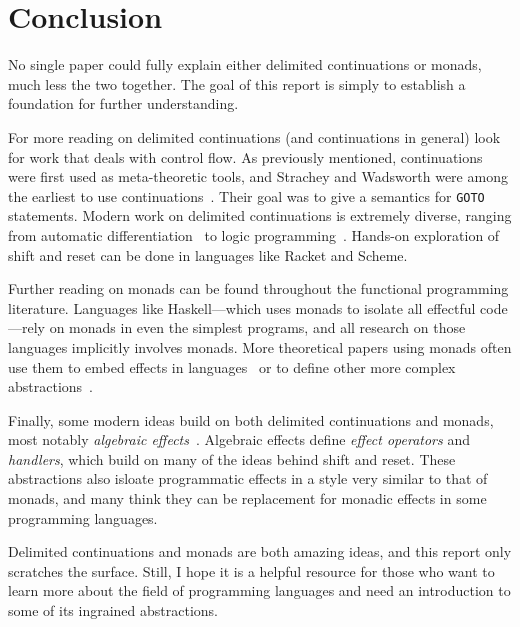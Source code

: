 \documentclass[acmsmall, nonacm, screen]{acmart}
\newcommand{\kw}[1]{\textsf{\color{ACMDarkBlue} #1}}
\begin{document}
\section{Conclusion} \label{sec:conclusion}
No single paper could fully explain either delimited continuations or monads, much less the two
together. The goal of this report is simply to establish a foundation for further understanding.

For more reading on delimited continuations (and continuations in general) look for work that
deals with control flow. As previously mentioned, continuations were first used as meta-theoretic
tools, and Strachey and Wadsworth were among the earliest to use
continuations~\cite{strachey2000continuations}. Their goal was to give a semantics for
\texttt{GOTO} statements. Modern work on delimited continuations is extremely diverse, ranging
from automatic differentiation~\cite{wang2019demystifying} to logic
programming~\cite{schrijvers2013delimited}. Hands-on exploration of \kw{shift} and \kw{reset} can
be done in languages like Racket and Scheme.

Further reading on monads can be found throughout the functional programming literature.
Languages like Haskell---which uses monads to isolate all effectful code---rely on monads in even
the simplest programs, and all research on those languages implicitly involves monads. More
theoretical papers using monads often use them to embed effects in
languages~\cite{paykin2017linearity} or to define other more complex
abstractions~\cite{xia2019interaction}.

Finally, some modern ideas build on both delimited continuations and monads, most notably {\em
algebraic effects}~\cite{bauer2015programming}. Algebraic effects define {\em effect operators}
and {\em handlers}, which build on many of the ideas behind \kw{shift} and \kw{reset}. These
abstractions also isloate programmatic effects in a style very similar to that of monads, and
many think they can be replacement for monadic effects in some programming languages.

Delimited continuations and monads are both amazing ideas, and this report only scratches the
surface. Still, I hope it is a helpful resource for those who want to learn more about the field
of programming languages and need an introduction to some of its ingrained abstractions.



\end{document}
